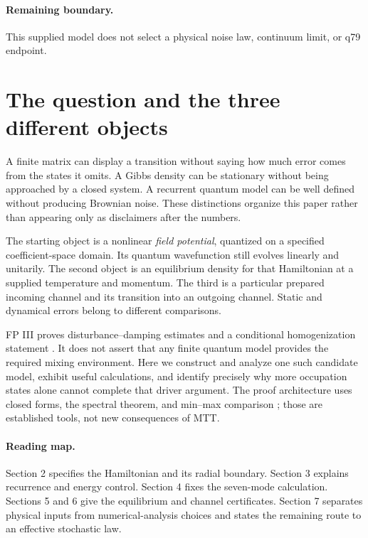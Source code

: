 \documentclass[11pt]{article}
\begin{document}
\paragraph{Remaining boundary.} This supplied model does not select a physical
noise law, continuum limit, or q79 endpoint.

\section{The question and the three different objects}
A finite matrix can display a transition without saying how much error
comes from the states it omits. A Gibbs density can be stationary without
being approached by a closed system. A recurrent quantum model can be
well defined without producing Brownian noise. These distinctions organize
this paper rather than appearing only as disclaimers after the numbers.

The starting object is a nonlinear \emph{field potential}, quantized on a
specified coefficient-space domain. Its quantum wavefunction still evolves
linearly and unitarily. The second object is an equilibrium density for
that Hamiltonian at a supplied temperature and momentum. The third is a
particular prepared incoming channel and its transition into an outgoing
channel. Static and dynamical errors belong to different comparisons.

FP III proves disturbance--damping estimates and a conditional
homogenization statement \cite{FP3}. It does not assert that any finite
quantum model provides the required mixing environment. Here we construct
and analyze one such candidate model, exhibit useful calculations, and
identify precisely why more occupation states alone cannot complete that
driver argument. The proof architecture uses closed forms, the spectral
theorem, and min--max comparison \cite{Teschl}; those are established tools,
not new consequences of MTT.

\paragraph{Reading map.}
Section 2 specifies the Hamiltonian and its radial boundary. Section 3
explains recurrence and energy control. Section 4 fixes the seven-mode
calculation. Sections 5 and 6 give the equilibrium and channel
certificates. Section 7 separates physical inputs from numerical-analysis
choices and states the remaining route to an effective stochastic law.
\end{document}
